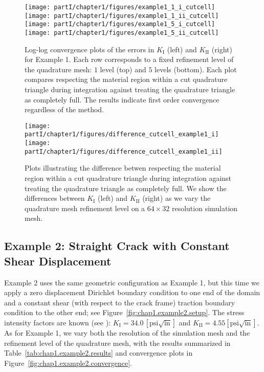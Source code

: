 \setlength{\figurewidth}{0.49\textwidth}
\begin{figure}[htbp]
\centering
\texttt{[image: partI/chapter1/figures/example1\_1\_i\_cutcell]}
\texttt{[image: partI/chapter1/figures/example1\_1\_ii\_cutcell]} \\
\texttt{[image: partI/chapter1/figures/example1\_5\_i\_cutcell]}
\texttt{[image: partI/chapter1/figures/example1\_5\_ii\_cutcell]}
\caption{Log-log convergence plots of the errors in $K_{\text{I}}$ (left) and $K_{\text{II}}$ (right) for Example 1. Each row corresponds to a fixed refinement level of the quadrature mesh: $1$ level (top) and $5$ levels (bottom). Each plot compares respecting the material region within a cut quadrature triangle during integration against treating the quadrature triangle as completely full. The results indicate first order convergence regardless of the method.}
\label{fig:chap1.cut_nocut.convergence}
\end{figure}

\setlength{\figurewidth}{0.49\textwidth}
\begin{figure}[htbp]
\centering
\texttt{[image: partI/chapter1/figures/difference\_cutcell\_example1\_i]}
\texttt{[image: partI/chapter1/figures/difference\_cutcell\_example1\_ii]}
\caption{Plots illustrating the difference betwen respecting the material region within a cut quadrature triangle during integration against treating the quadrature triangle as completely full. We show the differences between $K_{\text{I}}$ (left) and $K_{\text{II}}$ (right) as we vary the quadrature mesh refinement level on a $64 \times 32$ resolution simulation mesh.}
\label{fig:chap1.cut_nocut.diff}
\end{figure}

\subsection{Example 2: Straight Crack with Constant Shear Displacement}

Example 2 uses the same geometric configuration as Example 1, but this time we apply a zero displacement Dirichlet boundary condition to one end of the domain and a constant shear (with respect to the crack frame) traction boundary condition to the other end; see Figure~\ref{fig:chap1.example2.setup}. The stress intensity factors are known (see \cite{Moes99}): $K_{\text{I}} = 34.0 \, [\text{psi}\sqrt{\text{in}}]$ and $K_{\text{II}} = 4.55 [\text{psi}\sqrt{\text{in}}]$. As for Example 1, we vary both the resolution of the simulation mesh and the refinement level of the quadrature mesh, with the results summarized in Table~\ref{tab:chap1.example2.results} and convergence plots in Figure~\ref{fig:chap1.example2.convergence}.

